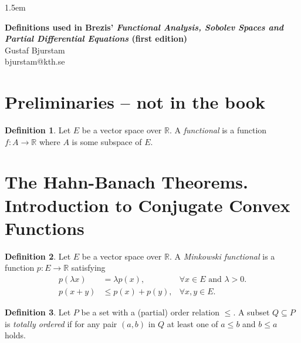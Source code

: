 \documentclass[12pt]{article}
\theoremstyle{definition}
\newtheorem{definition}{Definition}[section]
\newcommand{\real}{\mathbb{R}}   %
\begin{document}
\baselineskip 1.5em

\begin{center}
\textbf{\large Definitions used in Brezis' \textit{Functional Analysis, Sobolev Spaces and Partial Differential Equations} (first edition)} \\
Gustaf Bjurstam\\
bjurstam@kth.se\\
\end{center}
\section*{Preliminaries -- not in the book}
\begin{definition}
    Let $E$ be a vector space over $\real$. A \textit{functional} is a function $f:A\to\real$ where $A$ is some subspace of $E$.
\end{definition}

\section{The Hahn-Banach Theorems. Introduction to Conjugate Convex Functions}
\begin{definition}
    Let $E$ be a vector space over $\real$. A \textit{Minkowski functional} is a function $p:E\to\real$ satisfying
    \begin{align}
        p(\lambda x) &= \lambda p(x), &\forall x\in E \text{ and } \lambda > 0.\\
        p(x+y) &\leq p(x)+p(y), &\forall x,y\in E.
    \end{align}
\end{definition}
\begin{definition}
    Let $P$ be a set with a (partial) order relation $\leq$. A subset $Q\subseteq P$ is \textit{totally ordered} if for any pair $(a,b)$ in $Q$ at least one of $a\leq b$ and $b\leq a$ holds. 
\end{definition}
\end{document}
